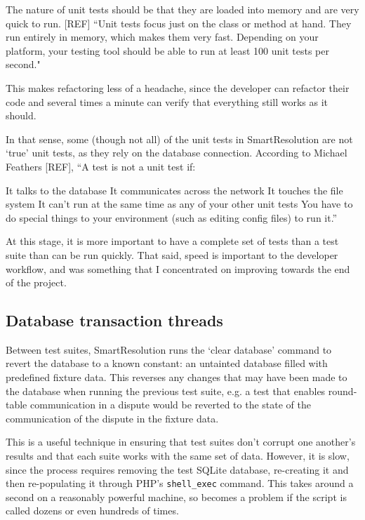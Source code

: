 The nature of unit tests should be that they are loaded into memory and are very quick to run. [REF] ``Unit tests focus just on the class or method at hand. They run entirely in memory, which makes them very fast. Depending on your platform, your testing tool should be able to run at least 100 unit tests per second." %

This makes refactoring less of a headache, since the developer can refactor their code and several times a minute can verify that everything still works as it should.

In that sense, some (though not all) of the unit tests in SmartResolution are not `true' unit tests, as they rely on the database connection. According to Michael Feathers [REF], ``A test is not a unit test if: %

It talks to the database
It communicates across the network
It touches the file system
It can't run at the same time as any of your other unit tests
You have to do special things to your environment (such as editing config files) to run it.''

At this stage, it is more important to have a complete set of tests than a test suite than can be run quickly. That said, speed is important to the developer workflow, and was something that I concentrated on improving towards the end of the project.

\subsection{Database transaction threads}

Between test suites, SmartResolution runs the `clear database' command to revert the database to a known constant: an untainted database filled with predefined fixture data. This reverses any changes that may have been made to the database when running the previous test suite, e.g. a test that enables round-table communication in a dispute would be reverted to the state of the communication of the dispute in the fixture data.

This is a useful technique in ensuring that test suites don't corrupt one another's results and that each suite works with the same set of data. However, it is slow, since the process requires removing the test SQLite database, re-creating it and then re-populating it through PHP's \lstinline{shell_exec} command. This takes around a second on a reasonably powerful machine, so becomes a problem if the script is called dozens or even hundreds of times.

